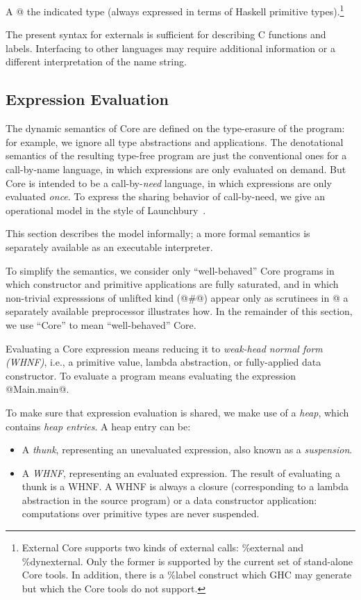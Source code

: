 \documentclass[10pt]{article}
\begin{document}
A @%
the indicated type (always expressed in terms of Haskell primitive types).\footnote{External Core supports two kinds of external calls: \%external and \%dynexternal. Only the former is supported by the current set of stand-alone Core tools. In addition, there is a \%label construct which GHC may generate but which the Core tools do not support.}

The present syntax for externals is sufficient for describing C functions and labels.
Interfacing to other languages may require additional information or a different interpretation
of the name string.


\subsection{Expression Evaluation}  
\label{sec:evaluation}

The dynamic semantics of Core are defined on the type-erasure of the program: for example, we ignore all type abstractions and applications.  The denotational semantics of
the resulting type-free program are just the conventional ones for a call-by-name
language, in which expressions are only evaluated on demand.
But Core is intended to be a call-by-{\it{need}} language, in which
expressions are only evaluated {\it once}.  To express the sharing behavior
of call-by-need, we give an operational model in the style of Launchbury~\citep{launchbury93natural}.

This section describes the model informally; a more formal semantics is
separately available as an executable interpreter.

To simplify the semantics, we consider only ``well-behaved'' Core programs in which
constructor and primitive applications are fully saturated, and in which
non-trivial expresssions of unlifted kind (@#@) appear only as scrutinees
in @%
a separately available preprocessor illustrates how.
In the remainder of this section, we use ``Core'' to mean ``well-behaved'' Core.

Evaluating a Core expression means reducing it to {\it weak-head normal form (WHNF)},
i.e., a primitive value, lambda abstraction, or fully-applied data constructor. To evaluate a program means evaluating the expression @Main.main@.

To make sure that expression evaluation is shared, we
make use of a {\it heap}, which contains {\it heap entries}. A heap entry can be:
\begin{itemize}
\item A {\em thunk}, representing an unevaluated expression, also known as a {\em suspension}.

\item A {\em WHNF}, representing an evaluated expression. The result of evaluating a thunk is a WHNF. A WHNF is always a closure (corresponding to a lambda abstraction in the source program) or a data constructor application: computations over primitive types are never suspended.
\end{itemize}
\end{document}
